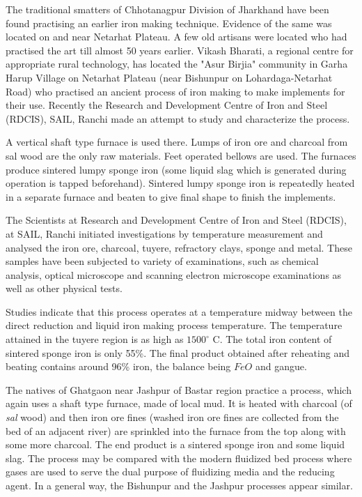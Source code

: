 \vspace{-.3cm}

The traditional smatters of Chhotanagpur Division of Jharkhand have been found practising an earlier iron making technique. Evidence of the same was located on and near Netarhat Plateau. A few old artisans were located who had practised the art till almost 50 years earlier. Vikash Bharati, a regional centre for appropriate rural technology, has located the "Asur Birjia" community in Garha Harup Village on Netarhat Plateau (near Bishunpur on Lohardaga-Netarhat Road) who practised an ancient process of iron making to make implements for their use. Recently the Research and Development Centre of Iron and Steel (RDCIS), SAIL, Ranchi made an attempt to study and characterize the process.

A vertical shaft type furnace is used there. Lumps of iron ore and charcoal from sal wood are the only raw materials. Feet operated bellows are used. The furnaces produce sintered lumpy sponge iron (some liquid slag which is generated during operation is tapped beforehand). Sintered lumpy sponge iron is repeatedly heated in a separate furnace and beaten to give final shape to finish the implements. 
\medskip

The Scientists at Research and Development Centre of Iron and Steel (RDCIS), at SAIL, Ranchi initiated investigations by temperature measurement and analysed the iron ore, charcoal, tuyere, refractory clays, sponge and metal. These samples have been subjected to variety of examinations, such as chemical analysis, optical microscope and scanning electron microscope examinations as well as other physical tests.

Studies indicate that this process operates at a temperature midway between the direct reduction and liquid iron making process temperature. The temperature attained in the tuyere region is as high as $1500^\circ$ C. The total iron content of sintered sponge iron is only 55\%. The final product obtained after reheating and beating contains around 96\% iron, the balance being $FeO$ and gangue. 

The natives of Ghatgaon near Jashpur of Bastar region practice a process, which again uses a shaft type furnace, made of local mud. It is heated with charcoal (of {\it sal} wood) and then iron ore fines (washed iron ore fines are collected from the bed of an adjacent river) are sprinkled into the furnace from the top along with some more charcoal. The end product is a sintered sponge iron and some liquid slag. The process may be compared with the modern fluidized bed process where gases are used to serve the dual purpose of fluidizing media and the reducing agent. In a general way, the Bishunpur and the Jashpur processes appear similar.

